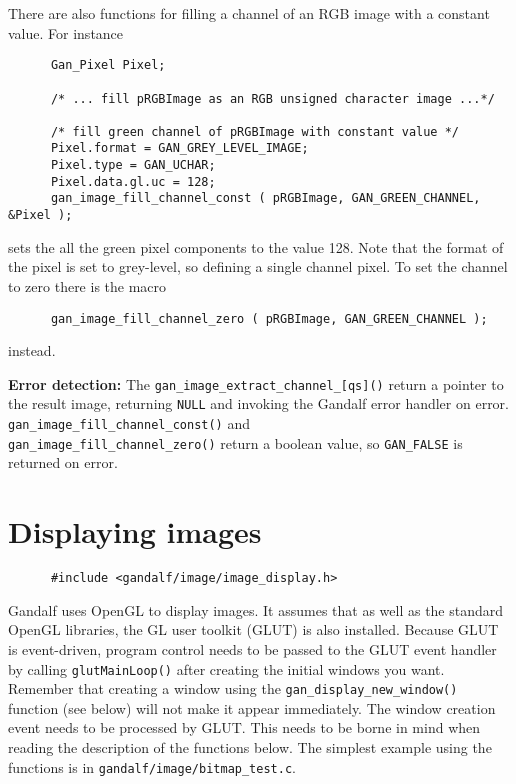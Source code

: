 There are also functions for filling a channel of an RGB image with
a constant value. For instance
\begin{verbatim}
      Gan_Pixel Pixel;

      /* ... fill pRGBImage as an RGB unsigned character image ...*/

      /* fill green channel of pRGBImage with constant value */
      Pixel.format = GAN_GREY_LEVEL_IMAGE;
      Pixel.type = GAN_UCHAR;
      Pixel.data.gl.uc = 128;
      gan_image_fill_channel_const ( pRGBImage, GAN_GREEN_CHANNEL, &Pixel );
\end{verbatim}
sets the all the green pixel components to the value 128. Note that
the format of the pixel is set to grey-level, so defining a single channel
pixel. To set the channel to zero there is the macro
\begin{verbatim}
      gan_image_fill_channel_zero ( pRGBImage, GAN_GREEN_CHANNEL );
\end{verbatim}
instead.

{\bf Error detection:} The {\tt gan\_image\_extract\_channel\_[qs]()}
return a pointer to the result image, returning {\tt NULL} and invoking
the Gandalf error handler on error. {\tt gan\_image\_fill\_channel\_const()}
and\\ {\tt gan\_image\_fill\_channel\_zero()} return a boolean value, so
{\tt GAN\_FALSE} is returned on error.

\section{Displaying images}
\begin{verbatim}
      #include <gandalf/image/image_display.h>
\end{verbatim}
Gandalf uses OpenGL to display images. It assumes that as well as the
standard OpenGL libraries, the GL user toolkit (GLUT) is also installed.
Because GLUT is event-driven, program control needs to be passed to the
GLUT event handler by calling {\tt glutMainLoop()} after creating the
initial windows you want. Remember that creating a window using the
{\tt gan\_display\_new\_window()} function (see below) will not make it
appear immediately. The window creation event needs to be processed by GLUT.
This needs to be borne in mind when reading the description of the functions
below. The simplest example using the functions is in
{\tt gandalf/image/bitmap\_test.c}.

